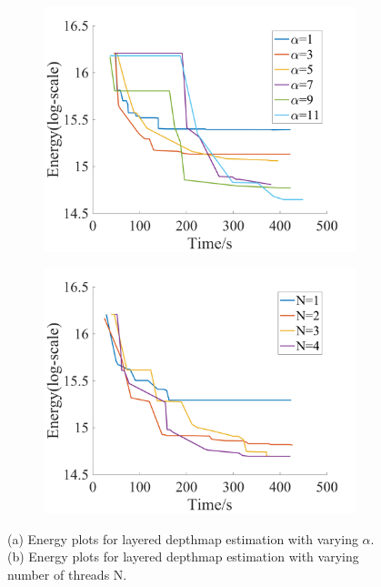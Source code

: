 \begin{figure}[!h]
  \centering
  \begin{subfigure}[b]{0.49\columnwidth}
    \centering
    \includegraphics[width=\columnwidth]{figure/layered_depthmap_by_alpha.png}
  \end{subfigure}  
  \begin{subfigure}[b]{0.49\columnwidth}
    \centering
    \includegraphics[width=\columnwidth]{figure/layered_depthmap_by_N.png}
  \end{subfigure}
  \caption{(a) Energy plots for layered depthmap estimation with varying
    $\alpha$. (b) Energy plots for layered depthmap estimation with varying number of threads N.}
  \label{fig:layered_depthmap_configuration}
\end{figure}


